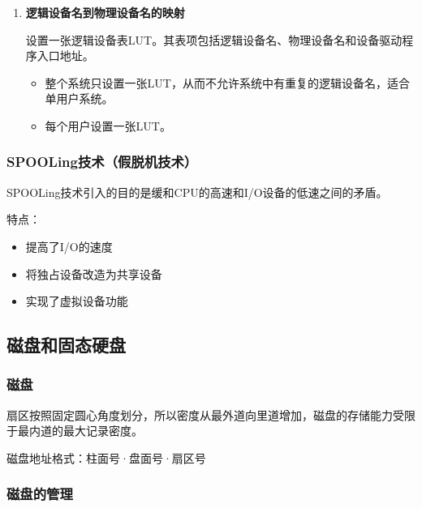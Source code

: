 \documentclass[12pt, a4paper, oneside]{ctexart}
\begin{document}
\begin{enumerate}
  \item {\bf 逻辑设备名到物理设备名的映射}
  
  设置一张逻辑设备表LUT。其表项包括逻辑设备名、物理设备名和设备驱动程序入口地址。
  \begin{itemize}
    \item 整个系统只设置一张LUT，从而不允许系统中有重复的逻辑设备名，适合单用户系统。
    \item 每个用户设置一张LUT。
  \end{itemize}
\end{enumerate}

\subsubsection{SPOOLing技术（假脱机技术）}

SPOOLing技术引入的目的是缓和CPU的高速和I/O设备的低速之间的矛盾。

特点：
\begin{itemize}
  \item 提高了I/O的速度
  \item 将独占设备改造为共享设备
  \item 实现了虚拟设备功能
\end{itemize}

\subsection{磁盘和固态硬盘}

\subsubsection{磁盘}

扇区按照固定圆心角度划分，所以密度从最外道向里道增加，磁盘的存储能力受限于最内道的最大记录密度。

磁盘地址格式：柱面号·盘面号·扇区号

\subsubsection{磁盘的管理}
\end{document}
